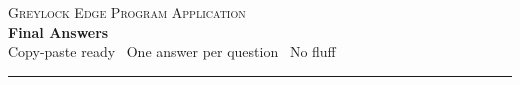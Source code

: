 \documentclass[10pt,a4paper]{article}
\begin{document}
\pagestyle{fancy}

\begin{center}
  {\fontsize{8}{10}\selectfont\scshape\color{CGray} Greylock Edge Program Application}\\[3pt]
  {\fontsize{18}{22}\selectfont\bfseries\color{CNavy} Final Answers}\\[2pt]
  {\small\color{CGray}Copy-paste ready \textbullet\ One answer per question \textbullet\ No fluff}
\end{center}

\noindent\textcolor{CLine}{\rule{\linewidth}{0.6pt}}
\vspace{2pt}

\end{document}
